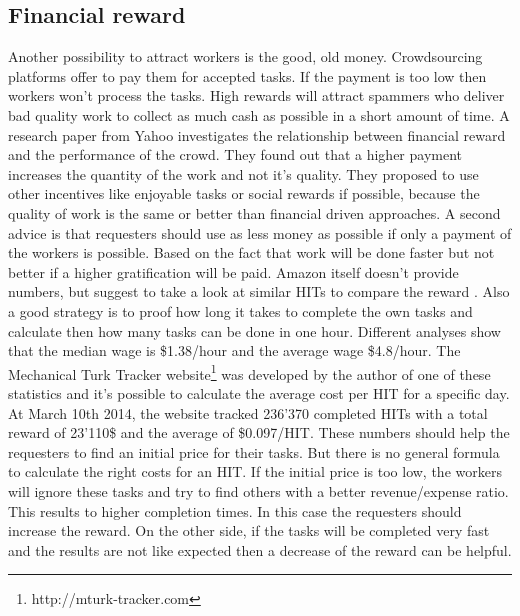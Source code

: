 \subsection{Financial reward}
Another possibility to attract workers is the good, old money. Crowdsourcing platforms offer to pay them for accepted tasks. If the payment is too low then workers won't process the tasks. High rewards will attract spammers who deliver bad quality work to collect as much cash as possible in a short amount of time. A research paper from Yahoo \cite{mason} investigates the relationship between financial reward and the performance of the crowd. They found out that a higher payment increases the quantity of the work and not it's quality. They proposed to use other incentives like enjoyable tasks or social rewards if possible, because the quality of work is the same or better than financial driven approaches. A second advice is that requesters should use as less money as possible if only a payment of the workers is possible. Based on the fact that work will be done faster but not better if a higher gratification will be paid. 
Amazon itself doesn't provide numbers, but suggest to take a look at similar HITs to compare the reward \cite{mturk_bestpractices}. Also a good strategy is to proof how long it takes to complete the own tasks and calculate then how many tasks can be done in one hour. Different analyses \cite{chilton,ipeirotis} show that the median wage is \$1.38/hour and the average wage \$4.8/hour. The Mechanical Turk Tracker website\footnote{http://mturk-tracker.com} was developed by the author of one of these statistics \cite{ipeirotis} and it's possible to calculate the average cost per HIT for a specific day. At March 10th 2014, the website tracked 236'370 completed HITs with a total reward of 23'110\$ and the average of \$0.097/HIT. These numbers should help the requesters to find an initial price for their tasks. But there is no general formula to calculate the right costs for an HIT. If the initial price is too low, the workers will ignore these tasks and try to find others with a better revenue/expense ratio. This results to higher completion times. In this case the requesters should increase the reward. On the other side, if the tasks will be completed very fast and the results are not like expected then a decrease of the reward can be helpful.

